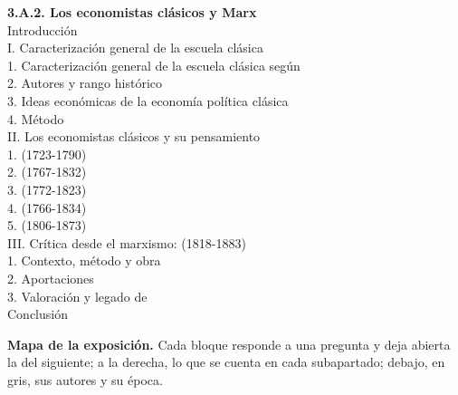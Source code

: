 \documentclass[11pt]{article}
\begin{document}
\begin{esquema}[unbreakable]
\textbf{3.A.2. Los economistas clásicos y Marx}\\[2pt]
Introducción\\
I. Caracterización general de la escuela clásica\\
\hspace*{1.5em}1. Caracterización general de la escuela clásica según \\
\hspace*{1.5em}2. Autores y rango histórico\\
\hspace*{1.5em}3. Ideas económicas de la economía política clásica\\
\hspace*{1.5em}4. Método\\
II. Los economistas clásicos y su pensamiento\\
\hspace*{1.5em}1.  (1723-1790)\\
\hspace*{1.5em}2.  (1767-1832)\\
\hspace*{1.5em}3.  (1772-1823)\\
\hspace*{1.5em}4.  (1766-1834)\\
\hspace*{1.5em}5.  (1806-1873)\\
III. Crítica desde el marxismo:  (1818-1883)\\
\hspace*{1.5em}1. Contexto, método y obra\\
\hspace*{1.5em}2. Aportaciones\\
\hspace*{1.5em}3. Valoración y legado de \\
Conclusión
\end{esquema}

\begin{anotaciones}
\textbf{Mapa de la exposición.} Cada bloque responde a una pregunta y deja abierta la del siguiente; a la derecha, lo que se cuenta en cada subapartado; debajo, en gris, sus autores y su época.
\begin{infografiacaja}
\caption{Mapa del tema: la pregunta de cada bloque, sus subapartados y el hilo que los une}\label{figu:mapa-tema}
\end{infografiacaja}
\end{anotaciones}
\end{document}
